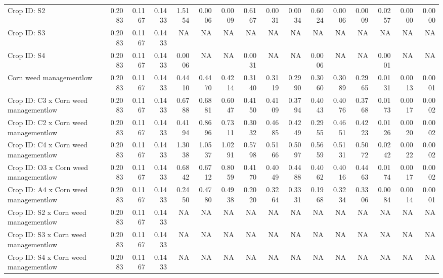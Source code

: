 \documentclass[
]{article}
\begin{document}
\begin{landscape}
\begin{table}
{\begin{tabular}[t]{lrr>{}rrr>{}rrr>{}rrr>{}rrr>{}r}
Crop ID: S2 & 0.2083 & 0.1167 & 0.1433 & 1.5154 & 0.0006 & 0.0009 & 0.6167 & 0.0031 & 0.0034 & 0.6024 & 0.0006 & 0.0009 & 0.0257 & 0.0000 & 0.0000\\
Crop ID: S3 & 0.2083 & 0.1167 & 0.1433 & NA & NA & NA & NA & NA & NA & NA & NA & NA & NA & NA & NA\\
Crop ID: S4 & 0.2083 & 0.1167 & 0.1433 & 0.0006 & NA & NA & 0.0031 & NA & NA & 0.0006 & NA & NA & 0.0001 & NA & NA\\
Corn weed managementlow & 0.2083 & 0.1167 & 0.1433 & 0.4410 & 0.4470 & 0.4214 & 0.3140 & 0.3119 & 0.2990 & 0.3060 & 0.3089 & 0.2965 & 0.0131 & 0.0013 & 0.0001\\
Crop ID: C3 x Corn weed managementlow & 0.2083 & 0.1167 & 0.1433 & 0.6788 & 0.6881 & 0.6047 & 0.4150 & 0.4109 & 0.3794 & 0.4043 & 0.4076 & 0.3768 & 0.0173 & 0.0017 & 0.0002\\
Crop ID: C2 x Corn weed managementlow & 0.2083 & 0.1167 & 0.1433 & 0.4194 & 0.8696 & 0.7311 & 0.3032 & 0.4685 & 0.4249 & 0.2955 & 0.4651 & 0.4223 & 0.0126 & 0.0020 & 0.0002\\
Crop ID: C4 x Corn weed managementlow & 0.2083 & 0.1167 & 0.1433 & 1.3038 & 1.0537 & 1.0291 & 0.5798 & 0.5166 & 0.5097 & 0.5659 & 0.5131 & 0.5072 & 0.0242 & 0.0022 & 0.0002\\
Crop ID: O3 x Corn weed managementlow & 0.2083 & 0.1167 & 0.1433 & 0.6842 & 0.6712 & 0.8059 & 0.4170 & 0.4049 & 0.4488 & 0.4062 & 0.4016 & 0.4463 & 0.0174 & 0.0017 & 0.0002\\
Crop ID: A4 x Corn weed managementlow & 0.2083 & 0.1167 & 0.1433 & 0.2450 & 0.4780 & 0.4938 & 0.2020 & 0.3264 & 0.3331 & 0.1968 & 0.3234 & 0.3306 & 0.0084 & 0.0014 & 0.0001\\
Crop ID: S2 x Corn weed managementlow & 0.2083 & 0.1167 & 0.1433 & NA & NA & NA & NA & NA & NA & NA & NA & NA & NA & NA & NA\\
Crop ID: S3 x Corn weed managementlow & 0.2083 & 0.1167 & 0.1433 & NA & NA & NA & NA & NA & NA & NA & NA & NA & NA & NA & NA\\
Crop ID: S4 x Corn weed managementlow & 0.2083 & 0.1167 & 0.1433 & NA & NA & NA & NA & NA & NA & NA & NA & NA & NA & NA & NA\\
\bottomrule
\end{tabular}}
\end{table}
\end{landscape}
\end{document}
